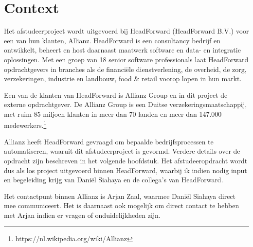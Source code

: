 \chapter{Context}
Het afstudeerproject wordt uitgevoerd bij HeadForward (HeadForward B.V.) voor een van hun klanten, Allianz. HeadForward is een consultancy bedrijf en ontwikkelt, beheert en host daarnaast maatwerk software en data- en integratie oplossingen. Met een groep van 18 senior software professionals laat HeadForward opdrachtgevers in branches als de financiële dienstverlening, de overheid, de zorg, verzekeringen, industrie en landbouw, food \& retail voorop lopen in hun markt.\par

Een van de klanten van HeadForward is Allianz Group en in dit project de externe opdrachtgever. De Allianz Group is een Duitse verzekeringsmaatschappij, met ruim 85 miljoen klanten in meer dan 70 landen en meer dan 147.000 medewerkers.\footnote{https://nl.wikipedia.org/wiki/Allianz} \par

Allianz heeft HeadForward gevraagd om bepaalde bedrijfsprocessen te automatiseren, waaruit dit afstudeerproject is gevormd. Verdere details over de opdracht zijn beschreven in het volgende hoofdstuk. Het afstudeeropdracht wordt dus als los project uitgevoerd binnen HeadForward, waarbij ik indien nodig input en begeleiding krijg van Dani\"el Siahaya en de collega's van HeadForward.\par

Het contactpunt binnen Allianz is Arjan Zaal, waarmee Dani\"el Siahaya direct mee communiceert. Het is daarnaast ook mogelijk om direct contact te hebben met Arjan indien er vragen of onduidelijkheden zijn.\par